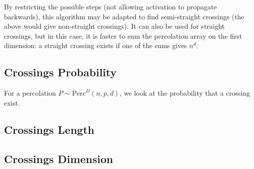 By restricting the possible steps (not allowing activation to propagate backwards), this algorithm may be adapted to find semi-straight crossings (the above would give non-straight crossings).
It can also be used for straight crossings, but in this case, it is faster to sum the percolation array on the first dimension: a straight crossing exists if one of the sums gives $n^d$.

\subsection{Crossings Probability}

For a percolation $P \sim \text{Perc}^D(n,p,d)$, we look at the probability that a crossing exist.




\subsection{Crossings Length}


\subsection{Crossings Dimension}

